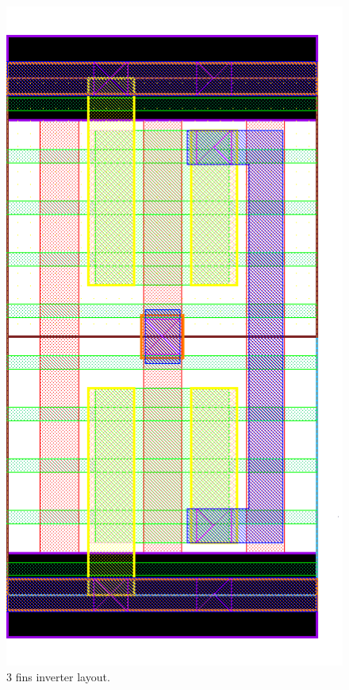 \documentclass[pgmicro,mestrado,english]{iiufrgs}
\begin{document}
\begin{figure}[H]
\centering
\includegraphics[width=\textwidth,height=\textheight,keepaspectratio]{INV3F.png}
\caption{3 fins inverter layout.}
\label{fig:INV3F}
\end{figure}
\end{document}
